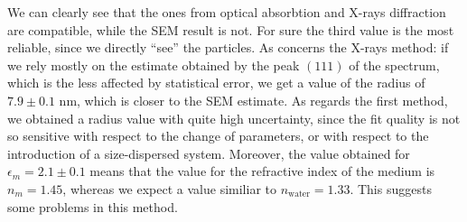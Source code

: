 \documentclass[prb,twocolumn]{revtex4-1}
\begin{document}
We can clearly see that the ones from optical absorbtion and X-rays diffraction are compatible, while the SEM result is not. For sure the third value is the most reliable, since we directly “see” the particles. As concerns the X-rays method: if we rely mostly on the estimate obtained by the peak $(1 1 1)$ of the spectrum, which is the less affected by statistical error, we get a value of the radius of $7.9 \pm 0.1$ nm, which is closer to the SEM estimate. 
As regards the first method, we obtained a radius value with quite high uncertainty, since the fit quality is not so sensitive with respect to the change of parameters, or with respect to the introduction of a size-dispersed system. Moreover, the value obtained for $\epsilon_m = 2.1 \pm 0.1$ means that the value for the refractive index of the medium is $n_m = 1.45$, whereas we expect a value similiar to $n_{\text{water}} = 1.33$. This suggests some problems in this method.
\end{document}
